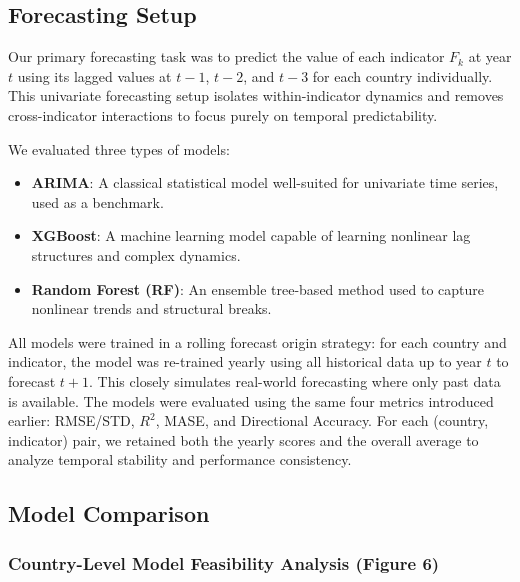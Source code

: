 \documentclass[12pt]{article}
\begin{document}
\subsection{Forecasting Setup}

Our primary forecasting task was to predict the value of each indicator $F_k$ at year $t$ using its lagged values at $t-1$, $t-2$, and $t-3$ for each country individually. This univariate forecasting setup isolates within-indicator dynamics and removes cross-indicator interactions to focus purely on temporal predictability. 

We evaluated three types of models:
\begin{itemize}
    \item \textbf{ARIMA}: A classical statistical model well-suited for univariate time series, used as a benchmark.
    \item \textbf{XGBoost}: A machine learning model capable of learning nonlinear lag structures and complex dynamics.
    \item \textbf{Random Forest (RF)}: An ensemble tree-based method used to capture nonlinear trends and structural breaks.
\end{itemize}

All models were trained in a rolling forecast origin strategy: for each country and indicator, the model was re-trained yearly using all historical data up to year $t$ to forecast $t+1$. This closely simulates real-world forecasting where only past data is available. The models were evaluated using the same four metrics introduced earlier: RMSE/STD, $R^2$, MASE, and Directional Accuracy. For each (country, indicator) pair, we retained both the yearly scores and the overall average to analyze temporal stability and performance consistency.

\subsection{Model Comparison}
\subsubsection*{Country-Level Model Feasibility Analysis (Figure 6)}
\end{document}
